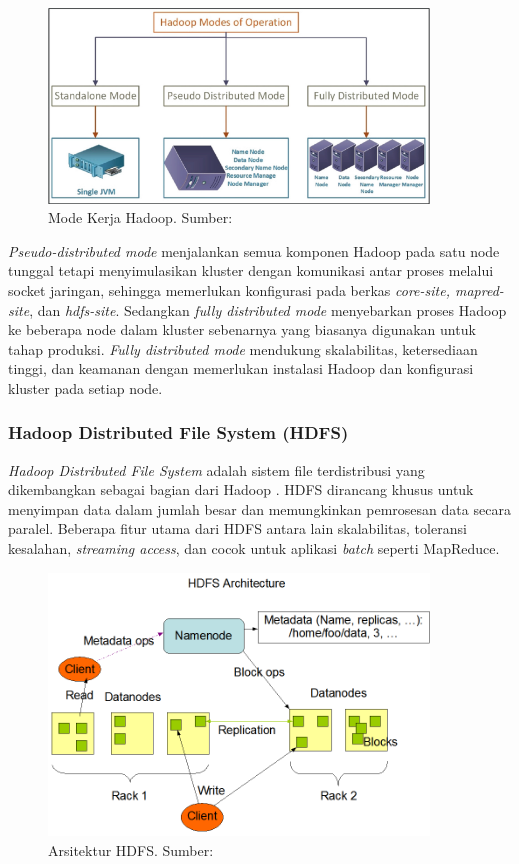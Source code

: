 \begin{figure}[h!]
    \centering
    \includegraphics[width=0.9\textwidth]{figures/ch02/hadoop-modes}
    \caption{Mode Kerja Hadoop. Sumber: \cite{khataiImplementationTextMining2021}}
    \label{fig:hadoop-modes}
\end{figure}

\textit{Pseudo-distributed mode} menjalankan semua komponen Hadoop pada satu node tunggal tetapi menyimulasikan kluster dengan komunikasi antar proses melalui socket jaringan, sehingga memerlukan konfigurasi pada berkas \textit{core-site, mapred-site}, dan \textit{hdfs-site}. Sedangkan \textit{fully distributed mode} menyebarkan proses Hadoop ke beberapa node dalam kluster sebenarnya yang biasanya digunakan untuk tahap produksi. \textit{Fully distributed mode} mendukung skalabilitas, ketersediaan tinggi, dan keamanan dengan memerlukan instalasi Hadoop dan konfigurasi kluster pada setiap node.

\subsubsection{Hadoop Distributed File System (HDFS)}
\textit{Hadoop Distributed File System} adalah sistem file terdistribusi yang dikembangkan sebagai bagian dari Hadoop \cite{abhishekIntegratedHadoopCloud2017}. HDFS dirancang khusus untuk menyimpan data dalam jumlah besar dan memungkinkan pemrosesan data secara paralel. Beberapa fitur utama dari HDFS antara lain skalabilitas, toleransi kesalahan, \textit{streaming access}, dan cocok untuk aplikasi \textit{batch} seperti MapReduce.

\begin{figure}[h!]
    \centering
    \includegraphics[width=0.9\textwidth]{figures/ch02/hdfsarchitecture}
    \caption{Arsitektur HDFS. Sumber: \cite{ApacheHadoopHDFS}}
    \label{fig:hdfs-arch}
\end{figure}

